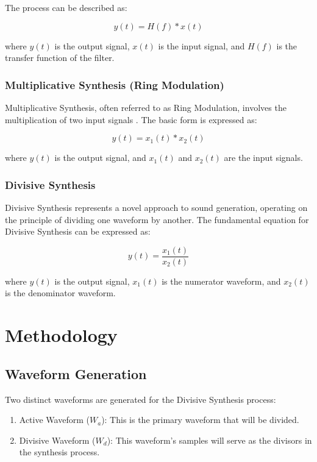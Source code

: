 \documentclass[12pt,a4paper]{article}
\begin{document}
The process can be described as:

\begin{equation*}
y(t) = H(f) * x(t)
\end{equation*}

where $y(t)$ is the output signal, $x(t)$ is the input signal, and $H(f)$ is the transfer function of the filter.

\subsubsection{Multiplicative Synthesis (Ring Modulation)}
Multiplicative Synthesis, often referred to as Ring Modulation, involves the multiplication of two input signals \cite{Multiplicative}. The basic form is expressed as:

\begin{equation*}
y(t) = x_1(t) * x_2(t)
\end{equation*}

where $y(t)$ is the output signal, and $x_1(t)$ and $x_2(t)$ are the input signals.

\subsubsection{Divisive Synthesis}

Divisive Synthesis represents a novel approach to sound generation, operating on the principle of dividing one waveform by another. The fundamental equation for Divisive Synthesis can be expressed as:

\begin{equation*}
y(t) = \frac{x_1(t)}{x_2(t)}
\end{equation*}

where $y(t)$ is the output signal, $x_1(t)$ is the numerator waveform, and $x_2(t)$ is the denominator waveform.
\section{Methodology}

\subsection{Waveform Generation}
Two distinct waveforms are generated for the Divisive Synthesis process:

\begin{enumerate}
    \item Active Waveform ($W_a$): This is the primary waveform that will be divided.
    \item Divisive Waveform ($W_d$): This waveform's samples will serve as the divisors in the synthesis process.
\end{enumerate}
\end{document}
